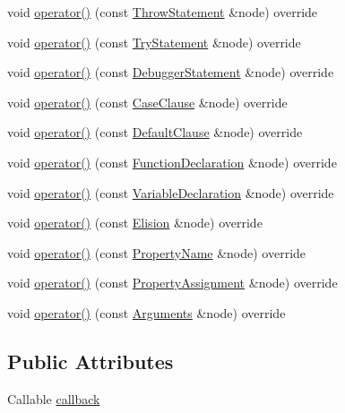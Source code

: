 \begin{DoxyCompactItemize}
\item 
void \hyperlink{struct_callable_visitor_af7d629f3f0fa66e3e8e38bd76c6cc729}{operator()} (const \hyperlink{structast_1_1_throw_statement}{Throw\+Statement} \&node) override
\item 
void \hyperlink{struct_callable_visitor_ae06c85aae9971525a8b880c5a398c8e3}{operator()} (const \hyperlink{structast_1_1_try_statement}{Try\+Statement} \&node) override
\item 
void \hyperlink{struct_callable_visitor_a5e2b63226fc91e23d9e59ec1ad4914c6}{operator()} (const \hyperlink{structast_1_1_debugger_statement}{Debugger\+Statement} \&node) override
\item 
void \hyperlink{struct_callable_visitor_a61efb29b38c0b4a1a46e392f1133013c}{operator()} (const \hyperlink{structast_1_1_case_clause}{Case\+Clause} \&node) override
\item 
void \hyperlink{struct_callable_visitor_ace58d18d6b2e0d27489b365db59e31ae}{operator()} (const \hyperlink{structast_1_1_default_clause}{Default\+Clause} \&node) override
\item 
void \hyperlink{struct_callable_visitor_a7d3ebcc10e02e0c9698170d957241846}{operator()} (const \hyperlink{structast_1_1_function_declaration}{Function\+Declaration} \&node) override
\item 
void \hyperlink{struct_callable_visitor_a81403b11d510563427191958e7a04d0b}{operator()} (const \hyperlink{structast_1_1_variable_declaration}{Variable\+Declaration} \&node) override
\item 
void \hyperlink{struct_callable_visitor_a72a62905dbd6c37719ab422462d7b8f5}{operator()} (const \hyperlink{structast_1_1_elision}{Elision} \&node) override
\item 
void \hyperlink{struct_callable_visitor_a2034a4d5531273c87f3fefbec8db6970}{operator()} (const \hyperlink{structast_1_1_property_name}{Property\+Name} \&node) override
\item 
void \hyperlink{struct_callable_visitor_aa88ba8cf86d84ccbc23c995ecf87bea8}{operator()} (const \hyperlink{structast_1_1_property_assignment}{Property\+Assignment} \&node) override
\item 
void \hyperlink{struct_callable_visitor_aa70a97d5a44ecc30aac8fb97c12cabb6}{operator()} (const \hyperlink{structast_1_1_arguments}{Arguments} \&node) override
\end{DoxyCompactItemize}
\subsection*{Public Attributes}
\begin{DoxyCompactItemize}
\item 
Callable \hyperlink{struct_callable_visitor_a52ce52c399eb34a2a16abec3361e48b8}{callback}
\end{DoxyCompactItemize}


